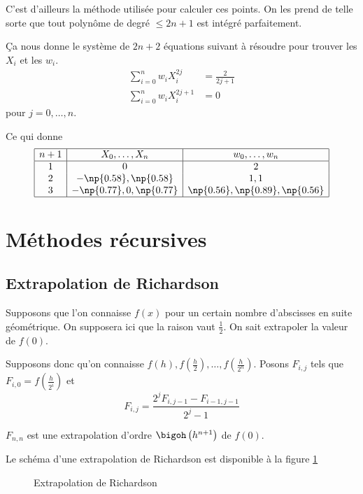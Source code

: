 C'est d'ailleurs la méthode utilisée pour calculer ces points.
On les prend de telle sorte que tout polynôme de degré $\leq 2n+1$ est
intégré parfaitement.

Ça nous donne le système de $2n+2$ équations suivant à résoudre
pour trouver les $X_i$ et les $w_i$.
\begin{align*}
  \sum_{i=0}^n w_i X_i^{2j} & = \frac{2}{2j+1}\\
  \sum_{i=0}^n w_i X_i^{2j+1} & = 0
\end{align*}
pour $j = 0, \ldots, n$.

Ce qui donne
\[
  \begin{array}{|c|c|c|}
    \hline
    n+1 & X_0, \ldots, X_n & w_0, \ldots, w_n\\
    \hline
    1 & 0 & 2\\
    2 & -\np{0.58}, \np{0.58} & 1, 1\\
    3 & -\np{0.77}, 0, \np{0.77} & \np{0.56}, \np{0.89}, \np{0.56}\\
    \hline
  \end{array}
\]

\section{Méthodes récursives}
\subsection{Extrapolation de Richardson}
Supposons que l'on connaisse $f(x)$ pour un certain nombre d'abscisses en
suite géométrique. On supposera ici que la raison vaut $\frac{1}{2}$.
On sait extrapoler la valeur de $f(0)$.

Supposons donc qu'on connaisse
$f(h), f\left(\frac{h}{2}\right), \ldots, f\left(\frac{h}{2^n}\right)$.
Posons
$F_{i, j}$ tels que $F_{i, 0} = f\left(\frac{h}{2^i}\right)$ et
\[ F_{i, j} = \frac{2^j F_{i, j-1} - F_{i-1, j-1}}{2^j - 1} \]

$F_{n, n}$ est une extrapolation d'ordre
$\bigoh\left(h^{n+1}\right)$ de $f(0)$.

Le schéma d'une extrapolation de Richardson est disponible à la figure \ref{Richardson}

\begin{figure}[!ht]
	\centering
	\label{Richardson}
	\caption{Extrapolation de Richardson}
\end{figure}

